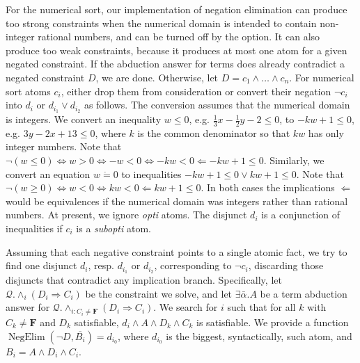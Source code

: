 \documentclass{article}
\newcommand{\tmem}[1]{{\em #1\/}}
\newcommand{\tmmathbf}[1]{\ensuremath{\boldsymbol{#1}}}
\newcommand{\tmop}[1]{\ensuremath{\operatorname{#1}}}
\newcommand{\tmverbatim}[1]{{\ttfamily{#1}}}
\begin{document}
For the numerical sort, our implementation of negation elimination can produce
too strong constraints when the numerical domain is intended to contain
non-integer rational numbers, and can be turned off by the
\tmverbatim{-no\_int\_negation} option. It can also produce too weak
constraints, because it produces at most one atom for a given negated
constraint. If the abduction answer for terms does already contradict a
negated constraint $D$, we are done. Otherwise, let $D = c_1 \wedge \ldots
\wedge c_n$. For numerical sort atoms $c_i$, either drop them from
consideration or convert their negation $\neg c_i$ into $d_i$ or $d_{i_1} \vee
d_{i_2}$ as follows. The conversion assumes that the numerical domain is
integers. We convert an inequality $w \leqslant 0$, e.g. $\frac{1}{3} x -
\frac{1}{2} y - 2 \leqslant 0$, to $- kw + 1 \leqslant 0$, e.g. $3 y - 2 x +
13 \leqslant 0$, where $k$ is the common denominator so that $kw$ has only
integer numbers. Note that $\neg (w \leqslant 0) \Leftrightarrow w > 0
\Leftrightarrow - w < 0 \Leftrightarrow - kw < 0 \Leftarrow - kw + 1 \leqslant
0$. Similarly, we convert an equation $w \dot{=} 0$ to inequalities $- kw + 1
\leqslant 0 \vee kw + 1 \leqslant 0$. Note that $\neg (w \geqslant 0)
\Leftrightarrow w < 0 \Leftrightarrow kw < 0 \Leftarrow kw + 1 \leqslant 0$.
In both cases the implications $\Leftarrow$ would be equivalences if the
numerical domain was integers rather than rational numbers. At present, we
ignore {\tmem{opti}} atoms. The disjunct $d_i$ is a conjunction of
inequalities if $c_i$ is a {\tmem{subopti}} atom.

Assuming that each negative constraint points to a single atomic fact, we try
to find one disjunct $d_i$, resp. $d_{i_1}$ or $d_{i_2}$, corresponding to
$\neg c_i$, discarding those disjuncts that contradict any implication branch.
Specifically, let $\mathcal{Q}. \wedge_i (D_i \Rightarrow C_i)$ be the
constraint we solve, and let $\exists \bar{\alpha} .A$ be a term abduction
answer for $\mathcal{Q}. \wedge_{i : C_i \neq \tmmathbf{F}} (D_i \Rightarrow
C_i)$. We search for $i$ such that for all $k$ with $C_k \neq \tmmathbf{F}$
and $D_k$ satisfiable, $d_i \wedge A \wedge D_k \wedge C_k$ is satisfiable. We
provide a function $\tmop{NegElim} (\neg D, \overline{B_i}) = d_{i_0}$, where
$d_{i_0}$ is the biggest, syntactically, such atom, and $B_i = A \wedge D_i
\wedge C_i$.
\end{document}
